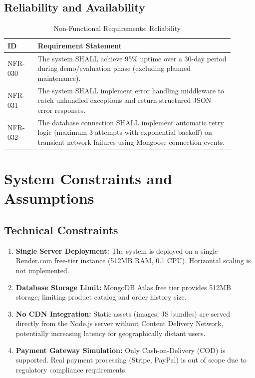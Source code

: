\documentclass[12pt, a4paper]{report}
\begin{document}
\subsection{Reliability and Availability}

\begin{table}[H]
\centering
\caption{Non-Functional Requirements: Reliability}
\label{tab:nfr_reliability}
\small
\begin{tabular}{@{}p{0.12\linewidth}p{0.78\linewidth}@{}}
\toprule
\textbf{ID} & \textbf{Requirement Statement} \\
\midrule
NFR-030 & The system SHALL achieve 95\% uptime over a 30-day period during demo/evaluation phase (excluding planned maintenance). \\
NFR-031 & The system SHALL implement error handling middleware to catch unhandled exceptions and return structured JSON error responses. \\
NFR-032 & The database connection SHALL implement automatic retry logic (maximum 3 attempts with exponential backoff) on transient network failures using Mongoose connection events. \\
\bottomrule
\end{tabular}
\end{table}

\section{System Constraints and Assumptions}

\subsection{Technical Constraints}

\begin{enumerate}
    \item \textbf{Single Server Deployment:} The system is deployed on a single Render.com free-tier instance (512MB RAM, 0.1 CPU). Horizontal scaling is not implemented.
    
    \item \textbf{Database Storage Limit:} MongoDB Atlas free tier provides 512MB storage, limiting product catalog and order history size.
    
    \item \textbf{No CDN Integration:} Static assets (images, JS bundles) are served directly from the Node.js server without Content Delivery Network, potentially increasing latency for geographically distant users.
    
    \item \textbf{Payment Gateway Simulation:} Only Cash-on-Delivery (COD) is supported. Real payment processing (Stripe, PayPal) is out of scope due to regulatory compliance requirements.
\end{enumerate}
\end{document}
